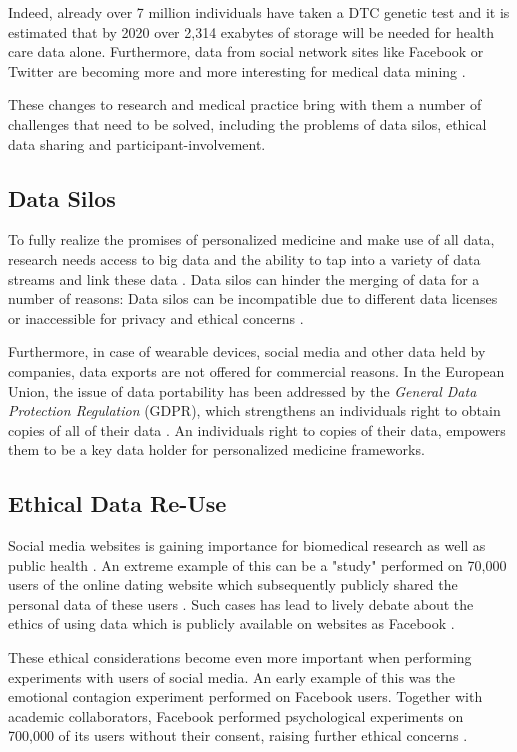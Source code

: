 \documentclass[a4paper,num-refs]{oup-contemporary}
\begin{document}
Indeed, already over 7 million individuals have taken a DTC genetic test \cite{growthancestry} and it is estimated that by 2020 over 2,314 exabytes of storage will be needed for health care data \cite{emc} alone. Furthermore, data from social network sites like Facebook or Twitter are becoming more and more interesting for medical data mining \cite{Rozenblum2013}.

These changes to research and medical practice bring with them a number of challenges that need to be solved, including the problems of data silos, ethical data sharing and participant-involvement.

\subsection{Data Silos}
To fully realize the promises of personalized medicine and make use of all data, research needs access to big data and the ability to tap into a variety of data streams and link these data \cite{Weber2014, Kohane2015}. Data silos can hinder the merging of data for a number of reasons: Data silos can be incompatible due to different data licenses \cite{Carbon2018} or inaccessible for privacy and ethical concerns \cite{Blasimme2018, Kossmann2014, Tenopir2011}. 

Furthermore, in case of wearable devices, social media and other data held by companies, data exports are not offered for commercial reasons. In the European Union, the issue of data portability has been addressed by the \emph{General Data Protection Regulation} (GDPR), which strengthens an individuals right to obtain copies of all of their data \cite{DeHert2018}. An individuals right to copies of their data, empowers them to be a key data holder for personalized medicine frameworks. 

\subsection{Ethical Data Re-Use}
Social media websites is gaining importance for biomedical research as well as public health \cite{Samerski2018}. An extreme example of this can be a "study" performed on 70,000 users of the online dating website which subsequently publicly shared the personal data of these users \cite{okcupid}. Such cases has lead to lively debate about the ethics of using data which is publicly available on websites as Facebook \cite{Zimmer2010, Zook2017}. 

These ethical considerations become even more important when performing experiments with users of social media. An early example of this was the emotional contagion experiment performed on Facebook users. Together with academic collaborators, Facebook performed psychological experiments on 700,000 of its users without their consent, raising further ethical concerns \cite{Jouhki2016, Hunter2016, Flick2015}. 
\end{document}
